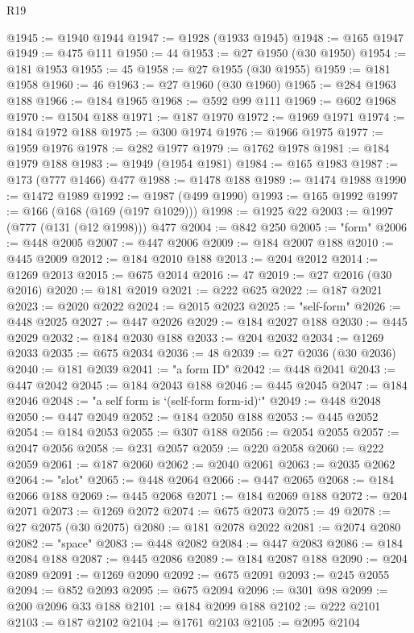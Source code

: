 \begin{lexlean}{R19}
\begin{coremodule}
@1945 := @1940 @1944
@1947 := @1928 (@1933 @1945)
@1948 := @165 @1947
@1949 := @475 @111
@1950 := 44
@1953 := @27 @1950 (@30 @1950)
@1954 := @181 @1953
@1955 := 45
@1958 := @27 @1955 (@30 @1955)
@1959 := @181 @1958
@1960 := 46
@1963 := @27 @1960 (@30 @1960)
@1965 := @284 @1963 @188
@1966 := @184 @1965
@1968 := @592 @99 @111
@1969 := @602 @1968
@1970 := @1504 @188
@1971 := @187 @1970
@1972 := @1969 @1971
@1974 := @184 @1972 @188
@1975 := @300 @1974
@1976 := @1966 @1975
@1977 := @1959 @1976
@1978 := @282 @1977
@1979 := @1762 @1978
@1981 := @184 @1979 @188
@1983 := @1949 (@1954 @1981)
@1984 := @165 @1983
@1987 := @173 (@777 @1466) @477
@1988 := @1478 @188
@1989 := @1474 @1988
@1990 := @1472 @1989
@1992 := @1987 (@499 @1990)
@1993 := @165 @1992
@1997 := @166 (@168 (@169 (@197 @1029)))
@1998 := @1925 @22
@2003 := @1997 (@777 (@131 (@12 @1998))) @477
@2004 := @842 @250
@2005 := "form"
@2006 := @448 @2005
@2007 := @447 @2006
@2009 := @184 @2007 @188
@2010 := @445 @2009
@2012 := @184 @2010 @188
@2013 := @204 @2012
@2014 := @1269 @2013
@2015 := @675 @2014
@2016 := 47
@2019 := @27 @2016 (@30 @2016)
@2020 := @181 @2019
@2021 := @222 @625
@2022 := @187 @2021
@2023 := @2020 @2022
@2024 := @2015 @2023
@2025 := "self-form"
@2026 := @448 @2025
@2027 := @447 @2026
@2029 := @184 @2027 @188
@2030 := @445 @2029
@2032 := @184 @2030 @188
@2033 := @204 @2032
@2034 := @1269 @2033
@2035 := @675 @2034
@2036 := 48
@2039 := @27 @2036 (@30 @2036)
@2040 := @181 @2039
@2041 := "a form ID"
@2042 := @448 @2041
@2043 := @447 @2042
@2045 := @184 @2043 @188
@2046 := @445 @2045
@2047 := @184 @2046
@2048 := "a self form is `(self-form form-id)`"
@2049 := @448 @2048
@2050 := @447 @2049
@2052 := @184 @2050 @188
@2053 := @445 @2052
@2054 := @184 @2053
@2055 := @307 @188
@2056 := @2054 @2055
@2057 := @2047 @2056
@2058 := @231 @2057
@2059 := @220 @2058
@2060 := @222 @2059
@2061 := @187 @2060
@2062 := @2040 @2061
@2063 := @2035 @2062
@2064 := "slot"
@2065 := @448 @2064
@2066 := @447 @2065
@2068 := @184 @2066 @188
@2069 := @445 @2068
@2071 := @184 @2069 @188
@2072 := @204 @2071
@2073 := @1269 @2072
@2074 := @675 @2073
@2075 := 49
@2078 := @27 @2075 (@30 @2075)
@2080 := @181 @2078 @2022
@2081 := @2074 @2080
@2082 := "space"
@2083 := @448 @2082
@2084 := @447 @2083
@2086 := @184 @2084 @188
@2087 := @445 @2086
@2089 := @184 @2087 @188
@2090 := @204 @2089
@2091 := @1269 @2090
@2092 := @675 @2091
@2093 := @245 @2055
@2094 := @852 @2093
@2095 := @675 @2094
@2096 := @301 @98
@2099 := @200 @2096 @33 @188
@2101 := @184 @2099 @188
@2102 := @222 @2101
@2103 := @187 @2102
@2104 := @1761 @2103
@2105 := @2095 @2104

\end{coremodule}
\end{lexlean}
